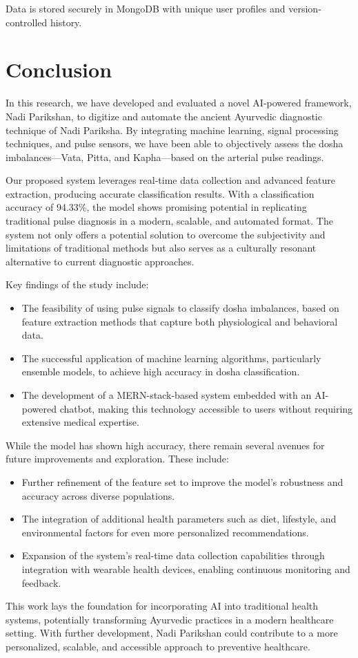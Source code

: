 \documentclass[10pt,twocolumn]{article}
\begin{document}
Data is stored securely in MongoDB with unique user profiles and version-controlled history.

\section{Conclusion}
In this research, we have developed and evaluated a novel AI-powered framework, Nadi Parikshan, to digitize and automate the ancient Ayurvedic diagnostic technique of Nadi Pariksha. By integrating machine learning, signal processing techniques, and pulse sensors, we have been able to objectively assess the dosha imbalances—Vata, Pitta, and Kapha—based on the arterial pulse readings.

Our proposed system leverages real-time data collection and advanced feature extraction, producing accurate classification results. With a classification accuracy of 94.33\%, the model shows promising potential in replicating traditional pulse diagnosis in a modern, scalable, and automated format. The system not only offers a potential solution to overcome the subjectivity and limitations of traditional methods but also serves as a culturally resonant alternative to current diagnostic approaches.

Key findings of the study include:
\begin{itemize}
    \item The feasibility of using pulse signals to classify dosha imbalances, based on feature extraction methods that capture both physiological and behavioral data.
    \item The successful application of machine learning algorithms, particularly ensemble models, to achieve high accuracy in dosha classification.
    \item The development of a MERN-stack-based system embedded with an AI-powered chatbot, making this technology accessible to users without requiring extensive medical expertise.
\end{itemize}

While the model has shown high accuracy, there remain several avenues for future improvements and exploration. These include:
\begin{itemize}
    \item Further refinement of the feature set to improve the model’s robustness and accuracy across diverse populations.
    \item The integration of additional health parameters such as diet, lifestyle, and environmental factors for even more personalized recommendations.
    \item Expansion of the system’s real-time data collection capabilities through integration with wearable health devices, enabling continuous monitoring and feedback.
\end{itemize}
This work lays the foundation for incorporating AI into traditional health systems, potentially transforming Ayurvedic practices in a modern healthcare setting. With further development, Nadi Parikshan could contribute to a more personalized, scalable, and accessible approach to preventive healthcare.
\end{document}
